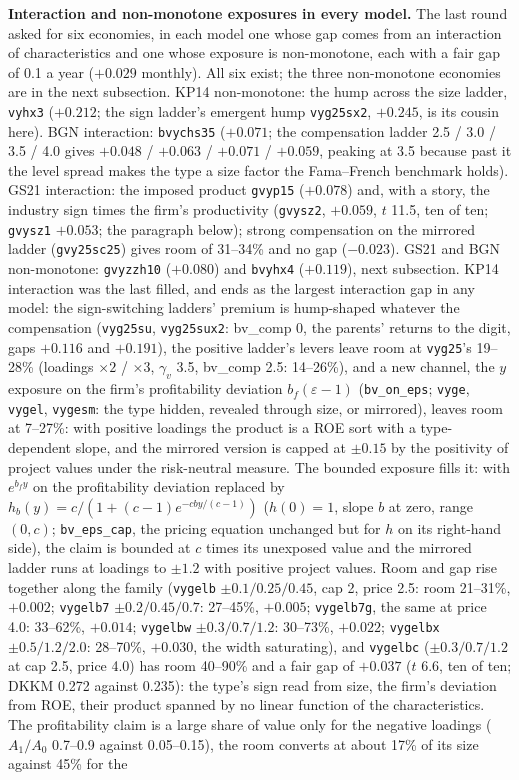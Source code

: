 \noindent\textbf{Interaction and non-monotone exposures in every model.} The last round asked for six economies, in each model one whose gap comes from an interaction of characteristics and one whose exposure is non-monotone, each with a fair gap of 0.1 a year ($+0.029$ monthly). All six exist; the three non-monotone economies are in the next subsection. KP14 non-monotone: the hump across the size ladder, \texttt{vyhx3} ($+0.212$; the sign ladder's emergent hump \texttt{vyg25sx2}, $+0.245$, is its cousin here). BGN interaction: \texttt{bvychs35} ($+0.071$; the compensation ladder 2.5 / 3.0 / 3.5 / 4.0 gives $+0.048$ / $+0.063$ / $+0.071$ / $+0.059$, peaking at 3.5 because past it the level spread makes the type a size factor the Fama--French benchmark holds). GS21 interaction: the imposed product \texttt{gvyp15} ($+0.078$) and, with a story, the industry sign times the firm's productivity (\texttt{gvysz2}, $+0.059$, $t$ 11.5, ten of ten; \texttt{gvysz1} $+0.053$; the paragraph below); strong compensation on the mirrored ladder (\texttt{gvy25sc25}) gives room of 31--34\% and no gap ($-0.023$). GS21 and BGN non-monotone: \texttt{gvyzzh10} ($+0.080$) and \texttt{bvyhx4} ($+0.119$), next subsection. KP14 interaction was the last filled, and ends as the largest interaction gap in any model: the sign-switching ladders' premium is hump-shaped whatever the compensation (\texttt{vyg25su}, \texttt{vyg25sux2}: bv\_comp 0, the parents' returns to the digit, gaps $+0.116$ and $+0.191$), the positive ladder's levers leave room at \texttt{vyg25}'s 19--28\% (loadings $\times2$ / $\times3$, $\gamma_v$ 3.5, bv\_comp 2.5: 14--26\%), and a new channel, the $y$ exposure on the firm's profitability deviation $b_f(\varepsilon-1)$ (\texttt{bv\_on\_eps}; \texttt{vyge}, \texttt{vygel}, \texttt{vygesm}: the type hidden, revealed through size, or mirrored), leaves room at 7--27\%: with positive loadings the product is a ROE sort with a type-dependent slope, and the mirrored version is capped at $\pm0.15$ by the positivity of project values under the risk-neutral measure. The bounded exposure fills it: with $e^{b_f y}$ on the profitability deviation replaced by $h_b(y) = c/(1+(c-1)e^{-cby/(c-1)})$ ($h(0)=1$, slope $b$ at zero, range $(0,c)$; \texttt{bv\_eps\_cap}, the pricing equation unchanged but for $h$ on its right-hand side), the claim is bounded at $c$ times its unexposed value and the mirrored ladder runs at loadings to $\pm1.2$ with positive project values. Room and gap rise together along the family (\texttt{vygelb} $\pm0.1/0.25/0.45$, cap 2, price 2.5: room 21--31\%, $+0.002$; \texttt{vygelb7} $\pm0.2/0.45/0.7$: 27--45\%, $+0.005$; \texttt{vygelb7g}, the same at price 4.0: 33--62\%, $+0.014$; \texttt{vygelbw} $\pm0.3/0.7/1.2$: 30--73\%, $+0.022$; \texttt{vygelbx} $\pm0.5/1.2/2.0$: 28--70\%, $+0.030$, the width saturating), and \texttt{vygelbc} ($\pm0.3/0.7/1.2$ at cap 2.5, price 4.0) has room 40--90\% and a fair gap of $+0.037$ ($t$ 6.6, ten of ten; DKKM 0.272 against 0.235): the type's sign read from size, the firm's deviation from ROE, their product spanned by no linear function of the characteristics. The profitability claim is a large share of value only for the negative loadings ($A_1/A_0$ 0.7--0.9 against 0.05--0.15), the room converts at about 17\% of its size against 45\% for the 